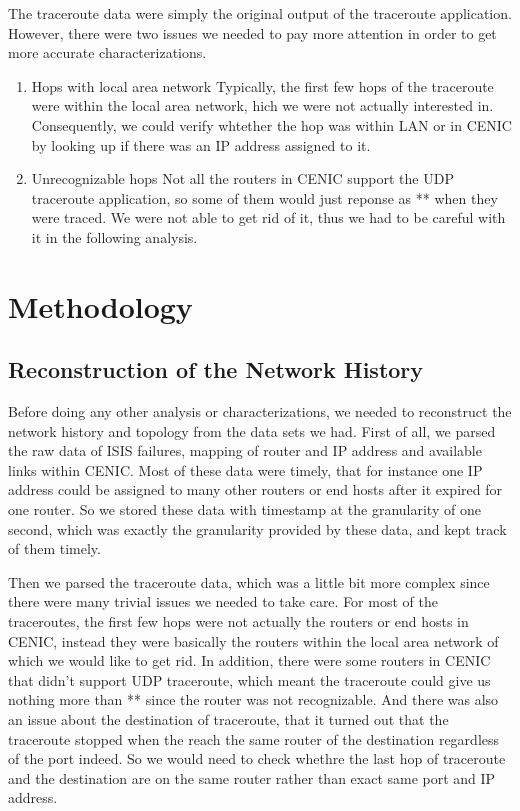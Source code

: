\documentclass[conference, twocolumn, oneside, 10pt]{IEEEtran}
\begin{document}
The traceroute data were simply the original output of the traceroute application. However, there were two issues we needed to pay more attention in order to get more accurate characterizations.

\begin{enumerate}

\item{Hops with local area network} Typically, the first few hops of the traceroute were within the local area network, hich we were not actually interested in. Consequently, we could verify whtether the hop was within LAN or in CENIC by looking up if there was an IP address assigned to it.

\item{Unrecognizable hops} Not all the routers in CENIC support the UDP traceroute application, so some of them would just reponse as ** when they were traced. We were not able to get rid of it, thus we had to be careful with it in the following analysis.

\end{enumerate}

\section{Methodology}
\label{sec:sec4}

\subsection{Reconstruction of the Network History}

Before doing any other analysis or characterizations, we needed to reconstruct the network history and topology from the data sets we had. First of all, we parsed the raw data of ISIS failures, mapping of router and IP address and available links within CENIC. Most of these data were timely, that for instance one IP address could be assigned to many other routers or end hosts after it expired for one router. So we stored these data with timestamp at the granularity of one second, which was exactly the granularity provided by these data, and kept track of them timely.

Then we parsed the traceroute data, which was a little bit more complex since there were many trivial issues we needed to take care. For most of the traceroutes, the first few hops were not actually the routers or end hosts in CENIC, instead they were basically the routers within the local area network of which we would like to get rid. In addition, there were some routers in CENIC that didn't support UDP traceroute, which meant the traceroute could give us nothing more than ** since the router was not recognizable. And there was also an issue about the destination of traceroute, that it turned out that the traceroute stopped when the reach the same router of the destination regardless of the port indeed. So we would need to check whethre the last hop of traceroute and the destination are on the same router rather than exact same port and IP address.
\end{document}
